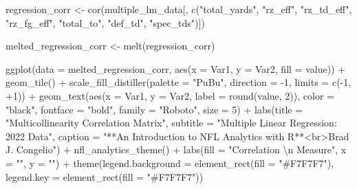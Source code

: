 \documentclass[
  letterpaper,
]{krantz}
\newenvironment{Shaded}{\begin{snugshade}}{\end{snugshade}}
\newcommand{\AttributeTok}[1]{\textcolor[rgb]{0.40,0.45,0.13}{#1}}
\newcommand{\DecValTok}[1]{\textcolor[rgb]{0.68,0.00,0.00}{#1}}
\newcommand{\FunctionTok}[1]{\textcolor[rgb]{0.28,0.35,0.67}{#1}}
\newcommand{\NormalTok}[1]{\textcolor[rgb]{0.00,0.23,0.31}{#1}}
\newcommand{\OtherTok}[1]{\textcolor[rgb]{0.00,0.23,0.31}{#1}}
\newcommand{\SpecialCharTok}[1]{\textcolor[rgb]{0.37,0.37,0.37}{#1}}
\newcommand{\StringTok}[1]{\textcolor[rgb]{0.13,0.47,0.30}{#1}}
\begin{document}
\begin{tcolorbox}
\begin{Shaded}
\begin{Highlighting}[]
\NormalTok{regression\_corr }\OtherTok{\textless{}{-}}
  \FunctionTok{cor}\NormalTok{(multiple\_lm\_data[, }\FunctionTok{c}\NormalTok{(}\StringTok{"total\_yards"}\NormalTok{,}
                           \StringTok{"rz\_eff"}\NormalTok{, }\StringTok{"rz\_td\_eff"}\NormalTok{,}
                           \StringTok{"rz\_fg\_eff"}\NormalTok{, }\StringTok{"total\_to"}\NormalTok{,}
                           \StringTok{"def\_td"}\NormalTok{, }\StringTok{"spec\_tds"}\NormalTok{)])}

\NormalTok{melted\_regression\_corr }\OtherTok{\textless{}{-}} \FunctionTok{melt}\NormalTok{(regression\_corr)}

\FunctionTok{ggplot}\NormalTok{(}\AttributeTok{data =}\NormalTok{ melted\_regression\_corr, }\FunctionTok{aes}\NormalTok{(}\AttributeTok{x =}\NormalTok{ Var1,}
                                          \AttributeTok{y =}\NormalTok{ Var2,}
                                          \AttributeTok{fill =}\NormalTok{ value)) }\SpecialCharTok{+}
  \FunctionTok{geom\_tile}\NormalTok{() }\SpecialCharTok{+}
  \FunctionTok{scale\_fill\_distiller}\NormalTok{(}\AttributeTok{palette =} \StringTok{"PuBu"}\NormalTok{,}
                       \AttributeTok{direction =} \SpecialCharTok{{-}}\DecValTok{1}\NormalTok{,}
                       \AttributeTok{limits =} \FunctionTok{c}\NormalTok{(}\SpecialCharTok{{-}}\DecValTok{1}\NormalTok{, }\SpecialCharTok{+}\DecValTok{1}\NormalTok{)) }\SpecialCharTok{+}
  \FunctionTok{geom\_text}\NormalTok{(}\FunctionTok{aes}\NormalTok{(}\AttributeTok{x =}\NormalTok{ Var1, }\AttributeTok{y =}\NormalTok{ Var2, }\AttributeTok{label =} \FunctionTok{round}\NormalTok{(value, }\DecValTok{2}\NormalTok{)),}
            \AttributeTok{color =} \StringTok{"black"}\NormalTok{,}
            \AttributeTok{fontface =} \StringTok{"bold"}\NormalTok{,}
            \AttributeTok{family =} \StringTok{"Roboto"}\NormalTok{, }\AttributeTok{size =} \DecValTok{5}\NormalTok{) }\SpecialCharTok{+}
  \FunctionTok{labs}\NormalTok{(}\AttributeTok{title =} \StringTok{"Multicollinearity Correlation Matrix"}\NormalTok{,}
       \AttributeTok{subtitle =} \StringTok{"Multiple Linear Regression: 2022 Data"}\NormalTok{,}
       \AttributeTok{caption =} \StringTok{"**An Introduction to NFL Analytics with R**\textless{}br\textgreater{}Brad J. Congelio"}\NormalTok{) }\SpecialCharTok{+}
  \FunctionTok{nfl\_analytics\_theme}\NormalTok{() }\SpecialCharTok{+}
  \FunctionTok{labs}\NormalTok{(}\AttributeTok{fill =} \StringTok{"Correlation }\SpecialCharTok{\textbackslash{}n}\StringTok{ Measure"}\NormalTok{, }\AttributeTok{x =} \StringTok{""}\NormalTok{, }\AttributeTok{y =} \StringTok{""}\NormalTok{) }\SpecialCharTok{+}
  \FunctionTok{theme}\NormalTok{(}\AttributeTok{legend.background =} \FunctionTok{element\_rect}\NormalTok{(}\AttributeTok{fill =} \StringTok{"\#F7F7F7"}\NormalTok{),}
        \AttributeTok{legend.key =} \FunctionTok{element\_rect}\NormalTok{(}\AttributeTok{fill =} \StringTok{"\#F7F7F7"}\NormalTok{))}
\end{Highlighting}
\end{Shaded}


\end{tcolorbox}
\end{document}
